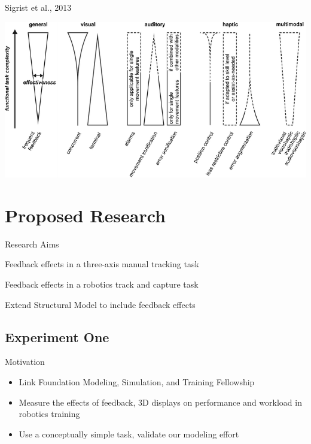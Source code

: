 \documentclass[10pt]{beamer}
\begin{document}
\begin{frame}[fragile]{Sigrist et al., 2013~\cite{Sigrist2013}}
  \begin{center}
    \includegraphics[width=\textwidth]{../img/sigrist.png}
  \end{center}
\end{frame}

\section{Proposed Research}

\begin{frame}[fragile]{Research Aims}
  \begin{description}[align=right]
    \setlength\itemsep{1em}
    \item [Aim One] Feedback effects in a three-axis manual tracking task
    \item [Aim Two] Feedback effects in a robotics track and capture task
    \item [Aim Three] Extend Structural Model to include feedback effects
  \end{description}
\end{frame}

\subsection{Experiment One}

\begin{frame}[fragile]{Motivation}
  \begin{itemize}
    \setlength\itemsep{1em}
    \item Link Foundation Modeling, Simulation, and Training Fellowship
    \item Measure the effects of feedback, 3D displays on performance and workload in robotics training
    \item Use a conceptually simple task, validate our modeling effort
  \end{itemize}
\end{frame}
\end{document}

